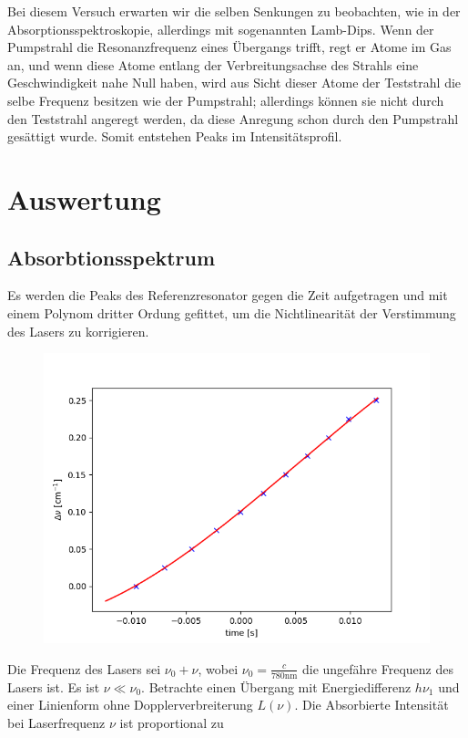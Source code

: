 \documentclass[a4paper,parskip]{scrartcl}
\begin{document}
Bei diesem Versuch erwarten wir die selben Senkungen zu beobachten, wie in der Absorptionsspektroskopie, allerdings mit sogenannten Lamb-Dips. Wenn der Pumpstrahl die Resonanzfrequenz eines Übergangs trifft, regt er Atome im Gas an, und wenn diese Atome entlang der Verbreitungsachse des Strahls eine Geschwindigkeit nahe Null haben, wird aus Sicht dieser Atome der Teststrahl die selbe Frequenz besitzen wie der Pumpstrahl; allerdings können sie nicht durch den Teststrahl angeregt werden, da diese Anregung schon durch den Pumpstrahl gesättigt wurde. Somit entstehen Peaks im Intensitätsprofil.

\section{Auswertung}

\subsection{Absorbtionsspektrum}

Es werden die Peaks des Referenzresonator gegen die Zeit aufgetragen und mit einem Polynom dritter Ordung gefittet, um die Nichtlinearität der Verstimmung des Lasers zu korrigieren.

\begin{figure}[h]
\centering
\includegraphics[scale = 0.5]{./absorbtion/frequencyCorrection}
\end{figure}

Die Frequenz des Lasers sei $\nu_0+\nu$, wobei $\nu_0=\frac{c}{780\mathrm{nm}}$ die ungefähre Frequenz des Lasers ist. Es ist $\nu \ll \nu_0$.
Betrachte einen Übergang mit Energiedifferenz $h\nu_1$ und einer Linienform ohne Dopplerverbreiterung $L(\nu)$.  Die Absorbierte Intensität bei Laserfrequenz $\nu$ ist proportional zu
\end{document}
